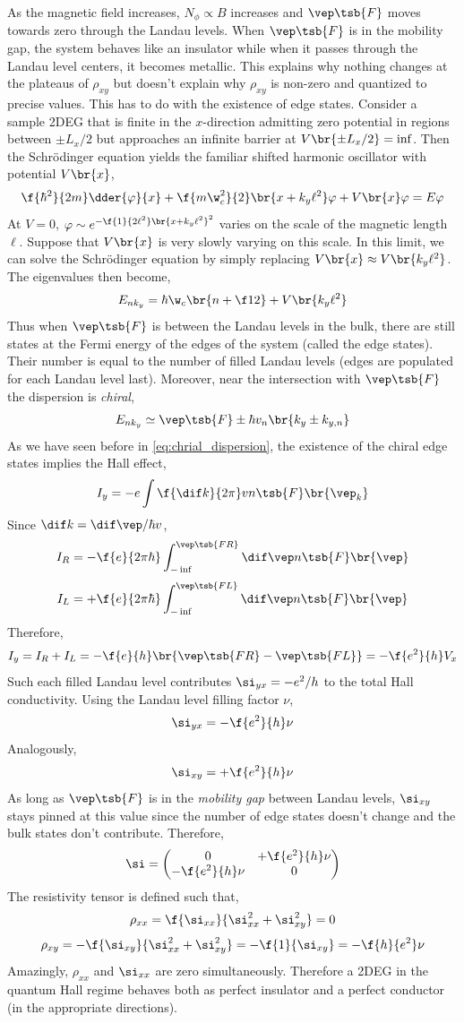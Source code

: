 \documentclass{article}
\begin{document}
As the magnetic field increases, $N_{\phi} \propto B$ increases and $\vep\tsb{F}$ moves towards zero through the Landau levels. When $\vep\tsb{F}$ is in the mobility gap, the system behaves like an insulator while when it passes through the Landau level centers, it becomes metallic. This explains why nothing changes at the plateaus of $\rho_{xy}$ but doesn't explain why $\rho_{xy}$ is non-zero and quantized to precise values. This has to do with the existence of edge states. Consider a sample 2DEG that is finite in the $x$-direction admitting zero potential in regions between $\pm L_x / 2$ but approaches an infinite barrier at $V\br{\pm L_x / 2} = \inf$. Then the Schrödinger equation yields the familiar shifted harmonic oscillator with potential $V\br{x}$,
\[ \f{\hbar^2}{2m} \dder{\varphi}{x} + \f{m\w_c^2}{2}\br{x + k_y \ell^2} \varphi + V\br{x} \varphi = E \varphi \]
At $V = 0$, $\varphi \sim e^{-\f{1}{2\ell^2}\br{x+k_y\ell^2}^2}$ varies on the scale of the magnetic length $\ell$. Suppose that $V\br{x}$ is very slowly varying on this scale. In this limit, we can solve the Schrödinger equation by simply replacing $V\br{x} \approx V\br{k_y \ell^2}$. The eigenvalues then become,
\[ E_{nk_y} = \hbar \w_c \br{n + \f12} + V\br{k_y \ell^2} \]
Thus when $\vep\tsb{F}$ is between the Landau levels in the bulk, there are still states at the Fermi energy of the edges of the system (called the edge states). Their number is equal to the number of filled Landau levels (edges are populated for each Landau level last). Moreover, near the intersection with $\vep\tsb{F}$ the dispersion is \textit{chiral},
\[ E_{n k_y} \simeq \vep\tsb{F}\pm\hbar v_n \br{k_y \pm k_{y,n}} \]
As we have seen before in \cref{eq:chrial_dispersion}, the existence of the chiral edge states implies the Hall effect,
\[ I_y = -e \int \f{\dif k}{2 \pi} v n\tsb{F}\br{\vep_k} \]
Since $\dif k = \dif \vep / \hbar v$,
\[ I_R = - \f{e}{2\pi \hbar}\int_{-\inf}^{\vep\tsb{FR}} \dif \vep n\tsb{F}\br{\vep} \]
\[ I_L = + \f{e}{2\pi \hbar}\int_{-\inf}^{\vep\tsb{FL}} \dif \vep n\tsb{F}\br{\vep} \]
Therefore,
\[ I_y = I_R + I_L = -\f{e}{h} \br{\vep\tsb{FR} - \vep\tsb{FL}} = -\f{e^2}{h}V_x \]
Such each filled Landau level contributes $\si_{yx} = - e^2 / h$ to the total Hall conductivity. Using the Landau level filling factor $\nu$,
\[ \si_{yx} = - \f{e^2}{h} \nu \]
Analogously,
\[ \si_{xy} = + \f{e^2}{h} \nu \]
As long as $\vep\tsb{F}$ is in the \textit{mobility gap} between Landau levels, $\si_{xy}$ stays pinned at this value since the number of edge states doesn't change and the bulk states don't contribute. Therefore,
\[ \si = \begin{pmatrix}
    0 & + \f{e^2}{h}\nu \\
    - \f{e^2}{h}\nu & 0 \\
\end{pmatrix} \]
The resistivity tensor is defined such that,
\[ \rho_{xx} = \f{\si_{xx}}{\si_{xx}^2 + \si_{xy}^2} = 0 \]
\[ \rho_{xy} = -\f{\si_{xy}}{\si_{xx}^2 +\si_{xy}^2} = - \f{1}{\si_{xy}} = - \f{h}{e^2} \nu \]
Amazingly, $\rho_{xx}$ and $\si_{xx}$ are zero simultaneously. Therefore a 2DEG in the quantum Hall regime behaves both as perfect insulator and a perfect conductor (in the appropriate directions).
\end{document}

